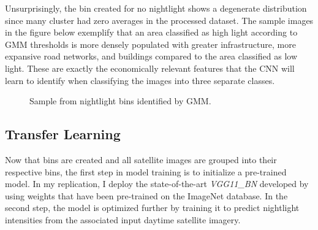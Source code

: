 \documentclass[11pt, a4paper, leqno]{article}
\begin{document}
 Unsurprisingly, the bin created for no nightlight shows a degenerate distribution since many cluster had zero averages in the processed dataset. The sample images in the figure below exemplify that an area classified as high light according to GMM thresholds is more densely populated with greater infrastructure, more expansive road networks, and buildings compared to the area classified as low light. These are exactly the economically relevant features that the CNN will learn to identify when classifying the images into three separate classes. 

\begin{figure}%
    \centering
    \qquad
    \caption{Sample from nightlight bins identified by GMM.}%
    \label{img_light}%
\end{figure}

\subsection{Transfer Learning}

 Now that bins are created and all satellite images are grouped into their respective bins, the first step in model training is to initialize a pre-trained model. In my replication, I deploy the state-of-the-art \textit{VGG11\_BN} developed by \citet{simonyan2014very} using weights that have been pre-trained on the ImageNet database. In the second step, the model is optimized further by training it to predict nightlight intensities from the associated input daytime satellite imagery.
\end{document}
